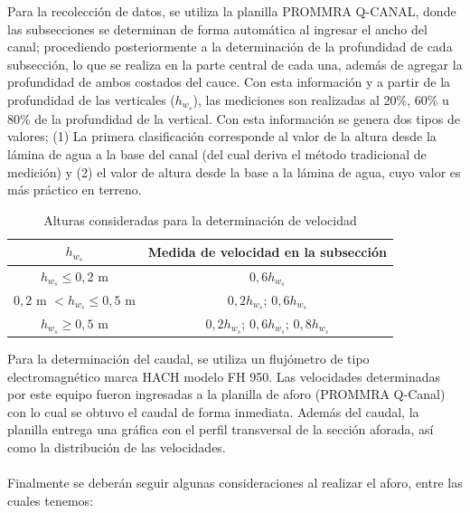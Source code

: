 \documentclass[]{article}
\begin{document}
Para la recolección de datos, se utiliza la planilla PROMMRA Q-CANAL, donde las subsecciones se determinan de forma automática al ingresar el ancho del canal; procediendo posteriormente a la determinación de la profundidad de cada subsección, lo que se realiza en la parte central de cada una, además de agregar la profundidad de ambos costados del cauce. Con esta información y a partir de la profundidad de las verticales (\(h_{w_s}\)), las mediciones son realizadas al 20\%, 60\% u 80\% de la profundidad de la vertical. Con esta información se genera dos tipos de valores; (1) La primera clasificación corresponde al valor de la altura desde la lámina de agua a la base del canal (del cual deriva el método tradicional de medición) y (2) el valor de altura desde la base a la lámina de agua, cuyo valor es más práctico en terreno.

\begin{table}[H]
 \caption{Alturas consideradas para la determinación de velocidad}
 \centering
 \begin{tabu} {cc}
 \toprule
 $h_{w_s}$ & Medida de velocidad en la subsección\\
 \midrule 
    $h_{w_s} \leq 0,2$ m & $0,6h_{w_s}$ \\ 
    $0,2$ m $< h_{w_s} \leq 0,5$ m  & $0,2h_{w_s}$; $0,6h_{w_s}$\\ 
    $h_{w_s} \geq 0,5$ m & $0,2h_{w_s}$; $0,6h_{w_s}$; $0,8h_{w_s}$\\
    \hline 
 \end{tabu}
\end{table}

Para la determinación del caudal, se utiliza un flujómetro de tipo electromagnético marca HACH modelo FH 950. Las velocidades determinadas por este equipo fueron ingresadas a la planilla de aforo (PROMMRA Q-Canal) con lo cual se obtuvo el caudal de forma inmediata. Además del caudal, la planilla entrega una gráfica con el perfil transversal de la sección aforada, así como la distribución de las velocidades.\\
\\
Finalmente se deberán seguir algunas consideraciones al realizar el aforo, entre las cuales tenemos:
\end{document}
